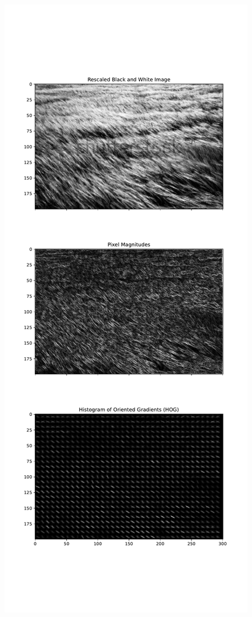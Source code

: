 \documentclass[
  letterpaper,
  DIV=11,
  numbers=noendperiod]{scrreprt}
\begin{document}
\begin{figure}[H]

{\centering \includegraphics{results_files/figure-pdf/unnamed-chunk-17-2.pdf}

}

\end{figure}
\end{document}
